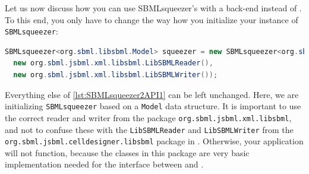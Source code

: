 Let us now discuss how you can use SBMLsqueezer's \API with a \libSBML back-end instead of \JSBML.
To this end, you only have to change the way how you initialize your instance of \texttt{SBMLsqueezer}:
\begin{lstlisting}[language=Java, numbers=none, caption={Initializing \texttt{SBMLsqueezer} with a \libSBML back-end}]
SBMLsqueezer<org.sbml.libsbml.Model> squeezer = new SBMLsqueezer<org.sbml.libsbml.Model>(
  new org.sbml.jsbml.xml.libsbml.LibSBMLReader(),
  new org.sbml.jsbml.xml.libsbml.LibSBMLWriter());
\end{lstlisting}
Everything else of \vref{lst:SBMLsqueezer2API1} can be left unchanged.
Here, we are initializing \texttt{SBMLsqueezer} based on a \libSBML \texttt{Model} data structure.
It is important to use the correct reader and writer from the package \texttt{org.sbml.jsbml.xml.libsbml}, and not to confuse these with the \texttt{LibSBMLReader} and \texttt{LibSBMLWriter} from the \texttt{org.sbml.jsbml.celldesigner.libsbml} package in \JSBML.
Otherwise, your application will not function, because the classes in this package are very basic implementation needed for the interface between \JSBML and \CellDesigner.

